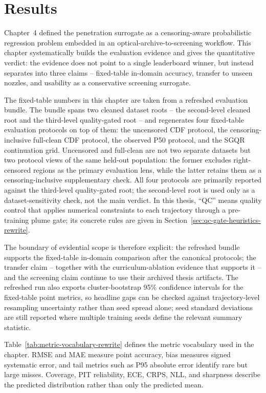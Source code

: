 \section{Results}

Chapter~4 defined the penetration surrogate as a censoring-aware probabilistic
regression problem embedded in an optical-archive-to-screening workflow. This
chapter systematically builds the evaluation evidence and gives the
quantitative verdict: the evidence does not point to a single leaderboard
winner, but instead separates into three claims -- fixed-table in-domain
accuracy, transfer to unseen nozzles, and usability as a conservative
screening surrogate.

The fixed-table numbers in this chapter are taken from a refreshed evaluation
bundle. The bundle spans two cleaned dataset roots -- the second-level
cleaned root and the third-level quality-gated root -- and regenerates four
fixed-table evaluation protocols on top of them: the uncensored CDF
protocol, the censoring-inclusive full-clean CDF protocol, the observed P50
protocol, and the SGQR continuation grid. Uncensored and full-clean are not
two separate datasets but two protocol views of the same held-out
population: the former excludes right-censored regions as the primary
evaluation lens, while the latter retains them as a censoring-inclusive
supplementary check. All four protocols are primarily reported against the
third-level quality-gated root; the second-level root is used only as a
dataset-sensitivity check, not the main verdict. In this thesis, ``QC''
means quality control that applies numerical constraints to each trajectory
through a pre-training plume gate; its concrete rules are given in
Section~\ref{sec:qc-gate-heuristics-rewrite}.

The boundary of evidential scope is therefore explicit: the refreshed bundle
supports the fixed-table in-domain comparison after the canonical protocols;
the transfer claim -- together with the curriculum-ablation evidence that
supports it -- and the screening claim continue to use their archived thesis
artifacts. The refreshed run also exports cluster-bootstrap 95\% confidence
intervals for the fixed-table point metrics, so headline gaps can be checked
against trajectory-level resampling uncertainty rather than seed spread
alone; seed standard deviations are still reported where multiple training
seeds define the relevant summary statistic.

Table~\ref{tab:metric-vocabulary-rewrite} defines the metric vocabulary used in
the chapter. RMSE and MAE measure point accuracy, bias measures signed
systematic error, and tail metrics such as P95 absolute error identify rare but
large misses. Coverage, PIT reliability, ECE, CRPS, NLL, and sharpness describe
the predicted distribution rather than only the predicted mean.

